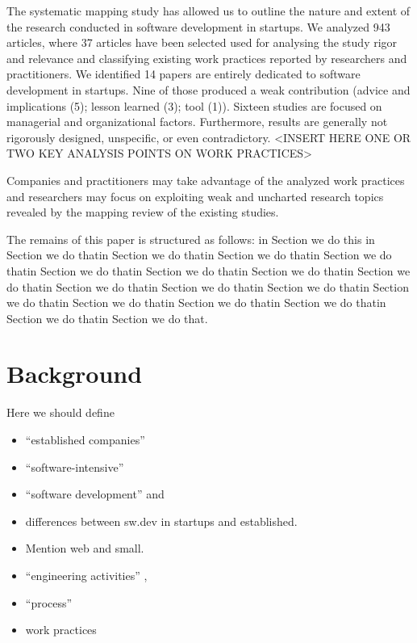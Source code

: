 \documentclass[final,5p,times,twocolumn]{elsarticle}
\begin{document}
The systematic mapping study has allowed us to outline the nature and extent of the research conducted in software development in startups. We analyzed 943 articles, where 37 articles have been selected used for analysing the study rigor and relevance and classifying existing work practices reported by researchers and practitioners. We identified 14 papers are entirely dedicated to software development in startups. Nine of those produced a weak contribution (advice and implications (5); lesson learned (3); tool (1)). Sixteen studies are focused on managerial and organizational factors. Furthermore, results are generally not rigorously designed, unspecific, or even contradictory. <INSERT HERE ONE OR TWO KEY ANALYSIS POINTS ON WORK PRACTICES>

Companies and practitioners may take advantage of the analyzed work practices and researchers may focus on exploiting weak and uncharted  research topics revealed by the mapping review of the existing studies.

The remains of this paper is structured as follows: in Section we do this in Section we do thatin Section we do thatin Section we do thatin Section we do thatin Section we do thatin Section we do thatin Section we do thatin Section we do thatin Section we do thatin Section we do thatin Section we do thatin Section we do thatin Section we do thatin Section we do thatin Section we do thatin Section we do thatin Section we do that.

\section{Background} %
 \label{sect:bg}

Here we should define 
\begin{itemize}
\item “established companies”
\item “software-intensive”
\item “software development” and 
\item differences between sw.dev in startups and established.  
\item Mention web and small. 
\item “engineering activities” , 
\item “process” 
\item work practices
\end{itemize}
\end{document}
